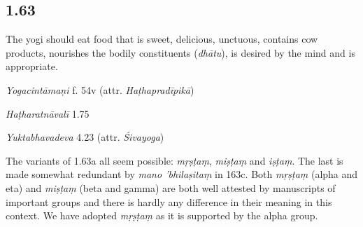 \begin{ekdosis}
\subsection*{1.63}
\begin{translation}[hp01_063]
The yogi should eat food that is sweet, delicious, unctuous, contains cow products, nourishes the bodily constituents (\emph{dhātu}), is desired by the mind and is appropriate.
\end{translation}


\begin{testimonia}[hp01_063]

\emph{Yogacintāmaṇi} f. 54v (attr. \emph{Haṭhapradīpikā})

\begin{versinnote}
\end{versinnote}

\emph{Haṭharatnāvalī} 1.75

\begin{versinnote}
\end{versinnote}

\emph{Yuktabhavadeva} 4.23 (attr. \emph{Śivayoga})

\begin{versinnote}
\end{versinnote}

\end{testimonia}

\begin{philcomm}[hp01_063]
The variants of 1.63a all seem possible: \emph{mṛṣṭaṃ}, \emph{miṣṭaṃ} and \emph{iṣṭaṃ}. The last is made somewhat redundant by \emph{mano 'bhilaṣitaṃ} in 163c. Both \emph{mṛṣṭaṃ} (alpha and eta) and \emph{miṣṭaṃ} (beta and gamma) are both well attested by manuscripts of important groups and there is hardly any difference in their meaning in this context. We have adopted \emph{mṛṣṭaṃ} as it is supported by the alpha group.
\end{philcomm}


\end{ekdosis}
